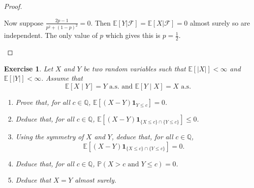 \documentclass{article}
\newtheorem{exercise}[theorem]{Exercise}
\begin{document}
\begin{proof}
\begin{enumerate}
    Now suppose $\frac{2p-1}{p^2+(1-p)^2}=0$. Then $\mathbb{E}[Y|\mathcal{F}]=\mathbb{E}[X|\mathcal{F}]=0$ almost surely so are independent. The only value of $p$ which gives this is $p=\frac{1}{2}$.
\end{enumerate}
\end{proof}

\begin{exercise}
Let $X$ and $Y$ be two random variables such that $\mathbb{E}[|X|] < \infty$ and $\mathbb{E}[|Y|] < \infty$. Assume that
\[
\mathbb{E}[X \mid Y] = Y \text{ a.s. and } \mathbb{E}[Y \mid X] = X \text{ a.s.}
\]

\begin{enumerate}
    \item[(a)] Prove that, for all $c \in \mathbb{Q}$, $\mathbb{E}[(X - Y) \mathbf{1}_{Y \leq c}] = 0$.
    
    \item[(b)] Deduce that, for all $c \in \mathbb{Q}$, $\mathbb{E}[(X - Y) \mathbf{1}_{\{X \leq c\} \cap \{Y \leq c\}}] \leq 0$.
    
    \item[(c)] Using the symmetry of $X$ and $Y$, deduce that, for all $c \in \mathbb{Q}$, 
    \[
    \mathbb{E}[(X - Y) \mathbf{1}_{\{X \leq c\} \cap \{Y \leq c\}}] = 0.
    \]
    
    \item[(d)] Deduce that, for all $c \in \mathbb{Q}$, $\mathbb{P}(X > c \text{ and } Y \leq c) = 0$.
    
    \item[(e)] Deduce that $X = Y$ almost surely.
\end{enumerate}
\end{exercise}
\end{document}
